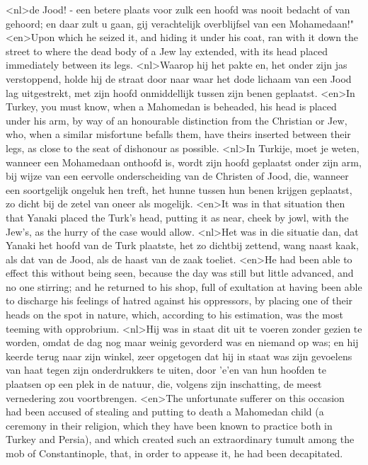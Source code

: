<nl>de Jood! - een betere plaats voor zulk een hoofd was nooit bedacht of van gehoord; en daar zult u gaan, gij verachtelijk overblijfsel van een Mohamedaan!"
<en>Upon which he seized it, and hiding it under his coat, ran with it down the street to where the dead body of a Jew lay extended, with its head placed immediately between its legs.
<nl>Waarop hij het pakte en, het onder zijn jas verstoppend, holde hij de straat door naar waar het dode lichaam van een Jood lag uitgestrekt, met zijn hoofd onmiddellijk tussen zijn benen geplaatst.
<en>In Turkey, you must know, when a Mahomedan is beheaded, his head is placed under his arm, by way of an honourable distinction from the Christian or Jew, who, when a similar misfortune befalls them, have theirs inserted between their legs, as close to the seat of dishonour as possible.
<nl>In Turkije, moet je weten, wanneer een Mohamedaan onthoofd is, wordt zijn hoofd geplaatst onder zijn arm, bij wijze van  een eervolle onderscheiding van de Christen of Jood, die, wanneer een soortgelijk ongeluk hen treft, het hunne tussen hun benen krijgen geplaatst, zo  dicht  bij de zetel van oneer als mogelijk.
<en>It was in that situation then that Yanaki placed the Turk's head, putting it as near, cheek by jowl, with the Jew's, as the hurry of the case would allow.
<nl>Het was in die situatie dan, dat Yanaki het hoofd van de Turk plaatste,    het zo dichtbij zettend, wang naast kaak, als dat van de Jood, als de haast van de zaak toeliet.
<en>He had been able to effect this without being seen, because the day was still but little advanced, and no one stirring; and he returned to his shop, full of exultation at having been able to discharge his feelings of hatred against his oppressors, by placing one of their heads on the spot in nature, which, according to his estimation, was the most teeming with opprobrium.
<nl>Hij was in staat dit uit te voeren zonder gezien te worden, omdat de dag nog maar weinig gevorderd was  en niemand op was; en hij keerde terug naar zijn winkel, zeer opgetogen dat hij in staat was  zijn gevoelens van haat tegen zijn onderdrukkers te uiten, door 'e'en van hun hoofden te plaatsen op een plek in de natuur, die, volgens zijn inschatting, de meest vernedering zou voortbrengen.
<en>The unfortunate sufferer on this occasion had been accused of stealing and putting to death a Mahomedan child (a ceremony in their religion, which they have been known to practice both in Turkey and Persia), and which created such an extraordinary tumult among the mob of Constantinople, that, in order to appease it, he had been decapitated.
